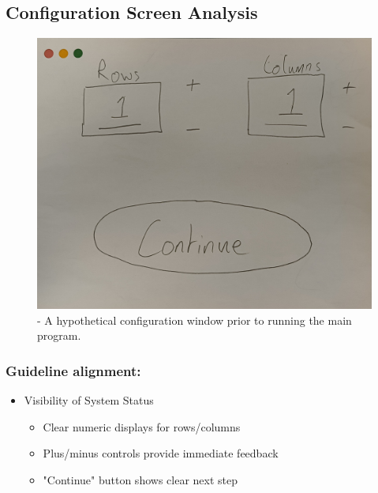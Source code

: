 \newpage

\subsection{Configuration Screen Analysis}
\begin{figure}[!htbp]
    \centering
    \includegraphics[width=1\linewidth]{Images/InitGUI.jpg}
    \caption{- A hypothetical configuration window prior to running the main program.}
\end{figure}

\newpage



\subsubsection{Guideline alignment:}


    \begin{itemize}
        \item Visibility of System Status
        \begin{itemize}
            \item Clear numeric displays for rows/columns
            \item Plus/minus controls provide immediate feedback
            \item "Continue" button shows clear next step
    
        \end{itemize}
    \end{itemize}
    
